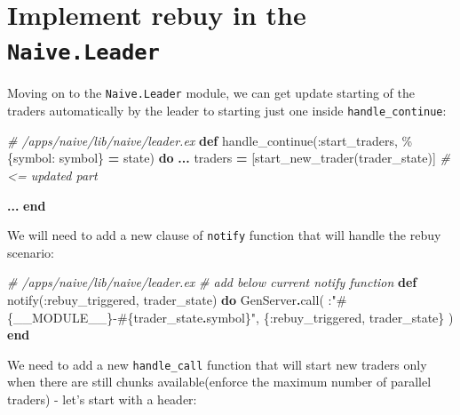 \documentclass[
  oneside]{book}
\newenvironment{Shaded}{\begin{snugshade}}{\end{snugshade}}
\newcommand{\CommentTok}[1]{\textcolor[rgb]{0.56,0.35,0.01}{\textit{#1}}}
\newcommand{\ConstantTok}[1]{\textcolor[rgb]{0.00,0.00,0.00}{#1}}
\newcommand{\KeywordTok}[1]{\textcolor[rgb]{0.13,0.29,0.53}{\textbf{#1}}}
\newcommand{\NormalTok}[1]{#1}
\newcommand{\OperatorTok}[1]{\textcolor[rgb]{0.81,0.36,0.00}{\textbf{#1}}}
\newcommand{\OtherTok}[1]{\textcolor[rgb]{0.56,0.35,0.01}{#1}}
\newcommand{\StringTok}[1]{\textcolor[rgb]{0.31,0.60,0.02}{#1}}
\newcommand{\VariableTok}[1]{\textcolor[rgb]{0.00,0.00,0.00}{#1}}
\begin{document}
\hypertarget{implement-rebuy-in-the-naive.leader}{%
\section{\texorpdfstring{Implement rebuy in the \texttt{Naive.Leader}}{Implement rebuy in the Naive.Leader}}\label{implement-rebuy-in-the-naive.leader}}

Moving on to the \texttt{Naive.Leader} module, we can get update starting of the traders automatically by the leader to starting just one inside \texttt{handle\_continue}:

\begin{Shaded}
\begin{Highlighting}[]
  \CommentTok{\# /apps/naive/lib/naive/leader.ex}
  \KeywordTok{def}\NormalTok{ handle\_continue(}\VariableTok{:start\_traders}\NormalTok{, \%\{}\VariableTok{symbol:}\NormalTok{ symbol\} }\OperatorTok{=}\NormalTok{ state) }\KeywordTok{do}
    \OperatorTok{...}
\NormalTok{    traders }\OperatorTok{=}\NormalTok{ [start\_new\_trader(trader\_state)] }\CommentTok{\# \textless{}= updated part}

    \OperatorTok{...}
  \KeywordTok{end}
\end{Highlighting}
\end{Shaded}

We will need to add a new clause of \texttt{notify} function that will handle the rebuy scenario:

\begin{Shaded}
\begin{Highlighting}[]
  \CommentTok{\# /apps/naive/lib/naive/leader.ex}
  \CommentTok{\# add below current \textasciigrave{}notify\textasciigrave{} function}
  \KeywordTok{def}\NormalTok{ notify(}\VariableTok{:rebuy\_triggered}\NormalTok{, trader\_state) }\KeywordTok{do}
    \ConstantTok{GenServer}\OperatorTok{.}\NormalTok{call(}
\NormalTok{      :}\StringTok{"}\OtherTok{\#\{}\ConstantTok{\_\_MODULE\_\_}\OtherTok{\}}\StringTok{{-}}\OtherTok{\#\{}\NormalTok{trader\_state}\OperatorTok{.}\NormalTok{symbol}\OtherTok{\}}\StringTok{"}\NormalTok{,}
\NormalTok{      \{}\VariableTok{:rebuy\_triggered}\NormalTok{, trader\_state\}}
\NormalTok{    )}
  \KeywordTok{end}
\end{Highlighting}
\end{Shaded}

We need to add a new \texttt{handle\_call} function that will start new traders only when there are still chunks available(enforce the maximum number of parallel
traders) - let's start with a header:
\end{document}
